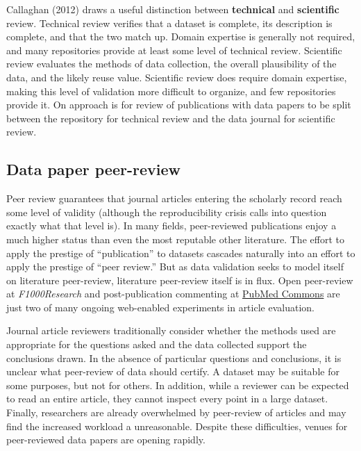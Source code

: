 \documentclass[10pt,twocolumn]{article}
\begin{document}
Callaghan (2012)\cite{sarah_callaghan_making_2012} draws a useful distinction between \textbf{technical} and \textbf{scientific} review.
Technical review verifies that a dataset is complete, its description is complete, and that the two match up.
Domain expertise is generally not required, and many repositories provide at least some level of technical review.
Scientific review evaluates the methods of data collection, the overall plausibility of the data, and the likely reuse value.
Scientific review does require domain expertise, making this level of validation more difficult to organize, and few repositories provide it.
On approach is for review of publications with data papers to be split between the repository for technical review and the data journal for scientific review.

\subsection*{Data paper peer-review}\label{data-paper-peer-review}

Peer review guarantees that journal articles entering the scholarly record reach some level of validity (although the reproducibility crisis calls into question exactly what that level is).
In many fields, peer-reviewed publications enjoy a much higher status than even the most reputable other literature.
The effort to apply the prestige of ``publication'' to datasets cascades naturally into an effort to apply the prestige of ``peer review.''
But as data validation seeks to model itself on literature peer-review, literature peer-review itself is in flux\cite{pulverer_transparent_2010, herron_is_2012, kriegeskorte_emerging_2012}.
Open peer-review at \emph{F1000Research} and post-publication commenting at \href{http://www.ncbi.nlm.nih.gov/pubmedcommons/}{PubMed Commons} are just two of many ongoing web-enabled experiments in article evaluation.

Journal article reviewers traditionally consider whether the methods used are appropriate for the questions asked and the data collected support the conclusions drawn.
In the absence of particular questions and conclusions, it is unclear what peer-review of data should certify.
A dataset may be suitable for some purposes, but not for others.\cite{parsons_data_2010}
In addition, while a reviewer can be expected to read an entire article, they cannot inspect every point in a large dataset.
Finally, researchers are already overwhelmed by peer-review of articles\cite{diederich_are_2013} and may find the increased workload a unreasonable.
Despite these difficulties, venues for peer-reviewed data papers are opening rapidly.
\end{document}
